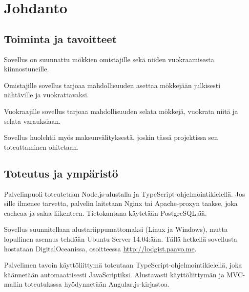 \chapter{Johdanto}

\section{Toiminta ja tavoitteet}

Sovellus on suunnattu mökkien omistajille sekä niiden vuokraamisesta
kiinnostuneille.

Omistajille sovellus tarjoaa mahdollisuuden asettaa mökkejään julkisesti
nähtäville ja vuokrattavaksi.

Vuokraajille sovellus tarjoaa mahdollisuuden selata mökkejä, vuokrata
niitä ja selata varauksiaan.

Sovellus huolehtii myös maksunvälityksestä, joskin tässä projektissa sen
toteuttaminen ohitetaan.

\section{Toteutus ja ympäristö}\label{toteutus-ja-ympuxe4ristuxf6}

Palvelinpuoli toteutetaan Node.js-alustalla ja
TypeScript-ohjelmointikielellä. Jos sille ilmenee tarvetta, palvelin
laitetaan Nginx tai Apache-proxyn taakse, joka cacheaa ja salaa
liikenteen. Tietokantana käytetään PostgreSQL:ää.

Sovellus suunnitellaan alustariippumattomaksi (Linux ja Windows), mutta lopullinen asennus tehdään Ubuntu Server 14.04:ään. Tällä hetkellä sovellusta hostataan DigitalOceanissa, osoitteessa
\url{http://lodgist.paavo.me}. 

Palvelimen tavoin käyttöliittymä toteutaan
TypeScript-ohjelmointikielellä, joka käännetään automaattisesti
JavaScriptiksi. Alustavasti käyttöliittymän ja MVC-mallin toteutuksssa
hyödynnetään Angular.js-kirjastoa.
